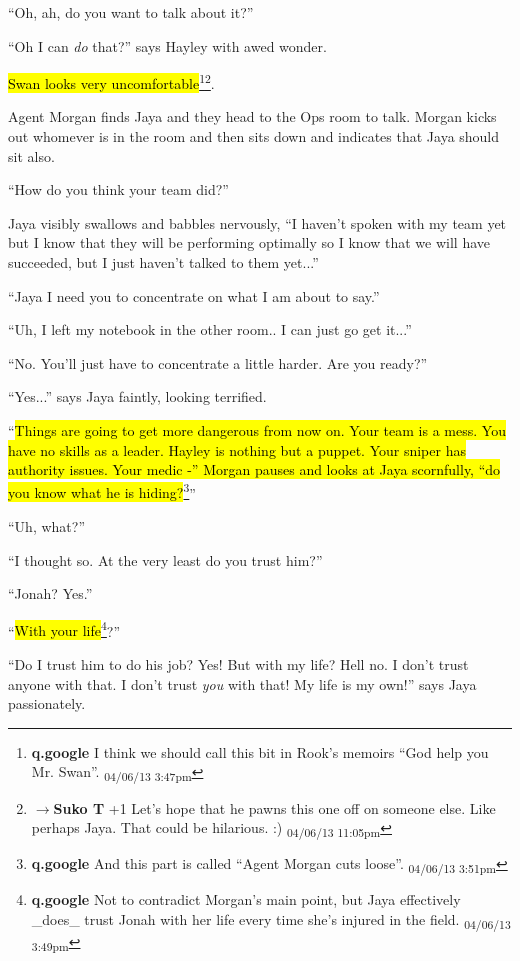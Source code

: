 ``Oh, ah, do you want to talk about it?''

``Oh I can \textit{do} that?'' says Hayley with awed wonder.

\hl{Swan looks very uncomfortable}\footnote{\textbf{q.google }I think we should call this bit in Rook's memoirs ``God help you Mr. Swan''. \textsubscript{04/06/13 3:47pm}}\footnote{$\rightarrow$\textbf{Suko T }+1  Let's hope that he pawns this one off on someone else.  Like perhaps Jaya.  That could be hilarious. :) \textsubscript{04/06/13 11:05pm}}.



Agent Morgan finds Jaya and they head to the Ops room to talk.  Morgan kicks out whomever is in the room and then sits down and indicates that Jaya should sit also.

``How do you think your team did?''

Jaya visibly swallows and babbles nervously, ``I haven't spoken with my team yet but I know that they will be performing optimally so I know that we will have succeeded, but I just haven't talked to them yet...''

``Jaya I need you to concentrate on what I am about to say.''

``Uh, I left my notebook in the other room.. I can just go get it...''

``No.  You'll just have to concentrate a little harder.  Are you ready?''

``Yes...'' says Jaya faintly, looking terrified.

``\hl{Things are going to get more dangerous from now on.  Your team is a mess.  You have no skills as a leader.  Hayley is nothing but a puppet.  Your sniper has authority issues.  Your medic -'' Morgan pauses and looks at Jaya scornfully, ``do you know what he is hiding?}\footnote{\textbf{q.google }And this part is called ``Agent Morgan cuts loose''. \textsubscript{04/06/13 3:51pm}}''

``Uh, what?''

``I thought so.  At the very least do you trust him?''

``Jonah?  Yes.''

``\hl{With your life}\footnote{\textbf{q.google }Not to contradict Morgan's main point, but Jaya effectively \_does\_ trust Jonah with her life every time she's injured in the field. \textsubscript{04/06/13 3:49pm}}?''

``Do I trust him to do his job?  Yes!  But with my life?  Hell no.  I don't trust anyone with that.  I don't trust \textit{you} with that!  My life is my own!'' says Jaya passionately.

